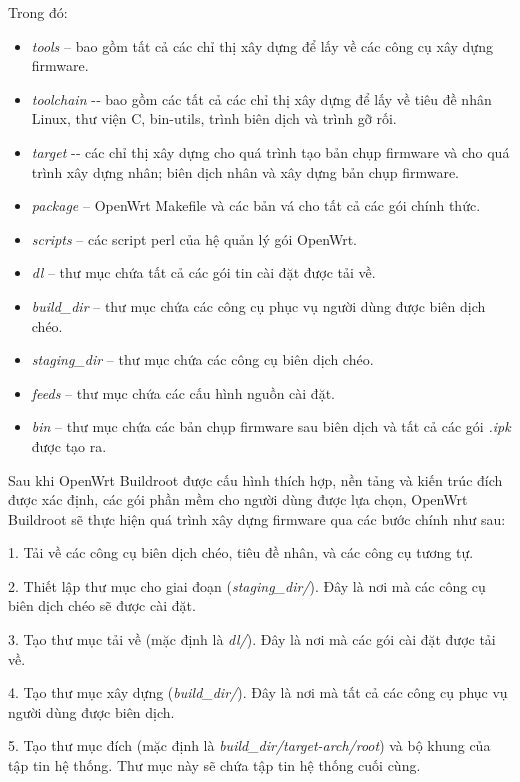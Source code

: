 Trong đó:
\begin{itemize}
\item \emph{tools} -- bao gồm tất cả các chỉ thị xây dựng để lấy về các công cụ xây dựng firmware.
\item \emph{toolchain} {-­‐} bao gồm các tất cả các chỉ thị xây dựng để lấy về tiêu đề nhân Linux, thư viện C, bin{-}utils, trình biên dịch và trình gỡ rối.
\item \emph{target} {-­‐} các chỉ thị xây dựng cho quá trình tạo bản chụp firmware và cho quá trình xây dựng nhân; biên dịch nhân và xây dựng bản chụp firmware.
\item \emph{package} -- OpenWrt Makefile và các bản vá cho tất cả các gói chính thức.
\item \emph{scripts} -- các script perl của hệ quản lý gói OpenWrt.
\item \emph{dl} -- thư mục chứa tất cả các gói tin cài đặt được tải về.
\item \emph{build\_dir} --  thư mục chứa các công cụ phục vụ người dùng được biên dịch chéo.
\item \emph{staging\_dir} -- thư mục chứa các công cụ biên dịch chéo.
\item \emph{feeds} -- thư mục chứa các cấu hình nguồn cài đặt.
\item \emph{bin} -- thư mục  chứa các bản chụp firmware sau biên dịch và tất cả các gói \emph{.ipk} được tạo ra.\\
\end{itemize}

Sau khi OpenWrt Buildroot được cấu hình thích hợp, nền tảng và kiến trúc đích được xác định, các gói phần mềm cho người dùng được lựa chọn, OpenWrt Buildroot sẽ thực hiện quá trình xây dựng firmware qua các bước chính như sau:

1. Tải về các công cụ biên dịch chéo, tiêu đề nhân, và các công cụ tương tự.

2. Thiết lập thư mục cho giai đoạn (\emph{staging\_dir/}). Đây là nơi mà các công cụ biên dịch chéo sẽ được cài đặt.   

3. Tạo thư mục tải về (mặc định là \emph{dl/}). Đây là nơi mà các gói cài đặt được tải về. 

4. Tạo thư mục xây dựng (\emph{build\_dir/}). Đây là nơi mà tất cả các công cụ phục vụ người dùng được biên dịch.

5. Tạo thư mục đích (mặc định là \emph{build\_dir/target-arch/root}) và bộ khung của tập tin hệ thống. Thư mục này sẽ chứa tập tin hệ thống cuối cùng. 

